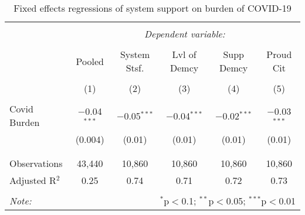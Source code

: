 
\begin{table}[!htbp] \centering 
  \caption{Fixed effects regressions of system support on burden of COVID-19} 
  \label{tab:sys_cbs} 
\begin{tabular}{@{\extracolsep{5pt}}lccccc} 
\\[-1.8ex]\hline 
\hline \\[-1.8ex] 
 & \multicolumn{5}{c}{\textit{Dependent variable:}} \\ 
\cline{2-6} 
\\[-1.8ex] & Pooled & System Stsf. & Lvl of Demcy & Supp Demcy & Proud Cit \\ 
\\[-1.8ex] & (1) & (2) & (3) & (4) & (5)\\ 
\hline \\[-1.8ex] 
 Covid Burden & $-$0.04$^{***}$ & $-$0.05$^{***}$ & $-$0.04$^{***}$ & $-$0.02$^{***}$ & $-$0.03$^{***}$ \\ 
  & (0.004) & (0.01) & (0.01) & (0.01) & (0.01) \\ 
  & & & & & \\ 
\hline \\[-1.8ex] 
Observations & 43,440 & 10,860 & 10,860 & 10,860 & 10,860 \\ 
Adjusted R$^{2}$ & 0.25 & 0.74 & 0.71 & 0.72 & 0.73 \\ 
\hline 
\hline \\[-1.8ex] 
\textit{Note:}  & \multicolumn{5}{r}{$^{*}$p$<$0.1; $^{**}$p$<$0.05; $^{***}$p$<$0.01} \\ 
\end{tabular} 
\end{table} 

